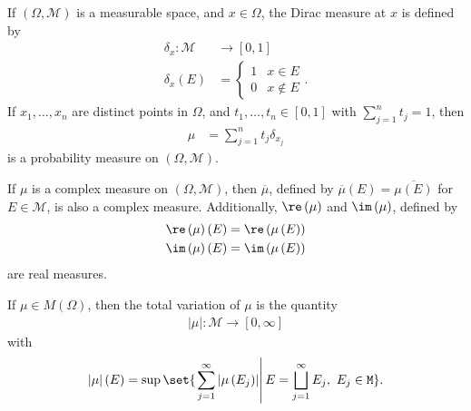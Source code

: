 \begin{definition}
  If $\left(\Omega,\mathcal{M}\right)$ is a measurable space, and $x\in \Omega$, the Dirac measure at $x$ is defined by
  \begin{align*}
    \delta_{x}\colon \mathcal{M}&\rightarrow [0,1]\\
    \delta_x\left(E\right) &= \begin{cases}
      1 & x\in E\\
      0 & x\notin E
    \end{cases}.
  \end{align*}
    If $x_1,\dots,x_n$ are distinct points in $\Omega$, and $t_1,\dots,t_n\in [0,1]$ with $\sum_{j=1}^{n}t_j = 1$, then
    \begin{align*}
      \mu &= \sum_{j=1}^{n}t_j\delta_{x_j}
    \end{align*}
    is a probability measure on $\left(\Omega,\mathcal{M}\right)$.
\end{definition}
\begin{fact}
  If $\mu$ is a complex measure on $\left(\Omega,\mathcal{M}\right)$, then $\overline{\mu}$, defined by $\overline{\mu}\left(E\right) = \overline{\mu\left(E\right)}$ for $E\in \mathcal{M}$, is also a complex measure. Additionally, $\re\left(\mu\right)$ and $\im\left(\mu\right)$, defined by
  \begin{align*}
    \re\left(\mu\right)\left(E\right) &= \re\left(\mu\left(E\right)\right)\\
    \im\left(\mu\right)\left(E\right) &= \im\left(\mu\left(E\right)\right)
  \end{align*}
  are real measures.
\end{fact}
\begin{definition}
  If $\mu\in M\left(\Omega\right)$, then the total variation of $\mu$ is the quantity
  \begin{align*}
    \left\vert \mu \right\vert\colon \mathcal{M}\rightarrow [0,\infty]
    \end{align*}
    with
    \begin{align*}
    \left\vert \mu \right\vert\left(E\right) = \sup\set{\left.\sum_{j=1}^{\infty}\left\vert \mu\left(E_j\right) \right\vert\right|E = \bigsqcup_{j=1}^{\infty}E_j,~E_j\in\mathcal{M}}.
  \end{align*}
\end{definition}
